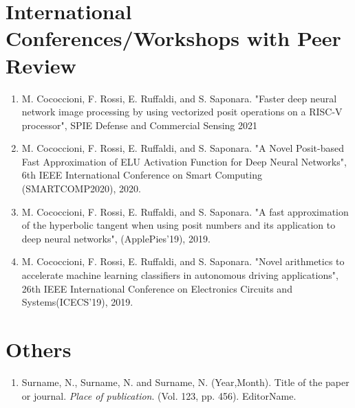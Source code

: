 \section*{International Conferences/Workshops with Peer Review}
\begin{enumerate}
    \item M. Cococcioni, F. Rossi, E. Ruffaldi, and S. Saponara. "Faster deep neural network image processing by using vectorized posit operations on a RISC-V processor", SPIE Defense and Commercial Sensing 2021 
    \item M. Cococcioni, F. Rossi, E. Ruffaldi, and S. Saponara. "A Novel Posit-based Fast Approximation of ELU Activation Function for Deep Neural Networks", 6th IEEE International Conference on Smart Computing (SMARTCOMP2020), 2020. 
    \item M. Cococcioni, F. Rossi, E. Ruffaldi, and S. Saponara. "A fast approximation of the hyperbolic tangent when using posit numbers and its application to deep neural networks", (ApplePies’19), 2019. \item M. Cococcioni, F. Rossi, E. Ruffaldi, and S. Saponara. "Novel arithmetics to accelerate machine learning classifiers in autonomous driving applications", 26th IEEE International Conference on Electronics Circuits and Systems(ICECS’19), 2019. 
\end{enumerate}

\section*{Others}
\begin{enumerate}
    \item Surname, N., Surname, N. and Surname, N. (Year,Month). Title of the paper or journal. \emph{Place of publication}. (Vol. 123, pp. 456). EditorName.
\end{enumerate}